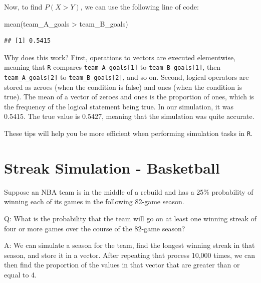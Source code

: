 \documentclass[
  11pt,
]{book}
\newenvironment{Shaded}{\begin{snugshade}}{\end{snugshade}}
\newcommand{\FunctionTok}[1]{\textcolor[rgb]{0.00,0.00,0.00}{#1}}
\newcommand{\NormalTok}[1]{#1}
\newcommand{\SpecialCharTok}[1]{\textcolor[rgb]{0.00,0.00,0.00}{#1}}
\theoremstyle{definition}
\theoremstyle{definition}
\theoremstyle{definition}
\theoremstyle{definition}
\theoremstyle{remark}
\begin{document}
Now, to find \(P(X > Y)\), we can use the following line of code:

\begin{Shaded}
\begin{Highlighting}[]
\FunctionTok{mean}\NormalTok{(team\_A\_goals }\SpecialCharTok{\textgreater{}}\NormalTok{ team\_B\_goals)}
\end{Highlighting}
\end{Shaded}

\begin{verbatim}
## [1] 0.5415
\end{verbatim}

Why does this work? First, operations to vectors are executed elementwise, meaning that \texttt{R} compares \texttt{team\_A\_goals{[}1{]}} to \texttt{team\_B\_goals{[}1{]}}, then \texttt{team\_A\_goals{[}2{]}} to \texttt{team\_B\_goals{[}2{]}}, and so on. Second, logical operators are stored as zeroes (when the condition is false) and ones (when the condition is true). The mean of a vector of zeroes and ones is the proportion of ones, which is the frequency of the logical statement being true. In our simulation, it was 0.5415. The true value is 0.5427, meaning that the simulation was quite accurate.

These tips will help you be more efficient when performing simulation tasks in \texttt{R}.

\hypertarget{streak-simulation---basketball}{%
\section{Streak Simulation - Basketball}\label{streak-simulation---basketball}}

Suppose an NBA team is in the middle of a rebuild and has a 25\% probability of winning each of its games in the following 82-game season.

Q: What is the probability that the team will go on at least one winning streak of four or more games over the course of the 82-game season?

A: We can simulate a season for the team, find the longest winning streak in that season, and store it in a vector. After repeating that process 10,000 times, we can then find the proportion of the values in that vector that are greater than or equal to 4.
\end{document}
